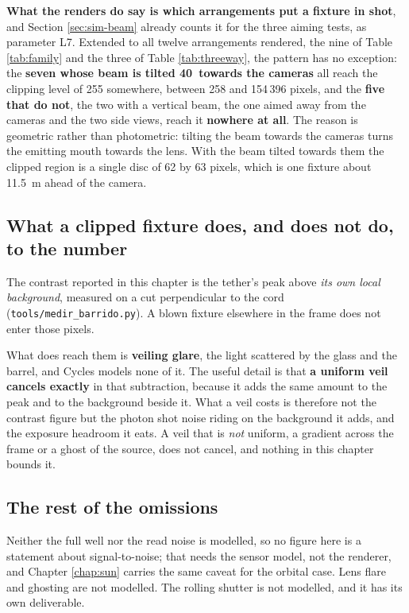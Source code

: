\textbf{What the renders do say is which arrangements put a fixture in
shot}, and Section \ref{sec:sim-beam} already counts it for the three aiming
tests, as parameter L7. Extended to all twelve arrangements rendered, the
nine of Table \ref{tab:family} and the three of Table \ref{tab:threeway}, the
pattern has no exception: the \textbf{seven whose beam is tilted
40\textdegree\ towards the cameras} all reach the clipping level of 255
somewhere, between 258 and 154\,396 pixels, and the \textbf{five that do
not}, the two with a vertical beam, the one aimed away from the cameras and
the two side views, reach it \textbf{nowhere at all}. The reason is geometric
rather than photometric: tilting the beam towards the cameras turns the
emitting mouth towards the lens. With the beam tilted towards them the
clipped region is a single disc of 62 by 63 pixels, which is one fixture
about 11.5~m ahead of the camera.

\subsection{What a clipped fixture does, and does not do, to the number}

The contrast reported in this chapter is the tether's peak above \emph{its
own local background}, measured on a cut perpendicular to the cord
(\texttt{tools/medir\_barrido.py}). A blown fixture elsewhere in the frame
does not enter those pixels.

What does reach them is \textbf{veiling glare}, the light scattered by the
glass and the barrel, and Cycles models none of it. The useful detail is that
\textbf{a uniform veil cancels exactly} in that subtraction, because it adds
the same amount to the peak and to the background beside it. What a veil
costs is therefore not the contrast figure but the photon shot noise riding
on the background it adds, and the exposure headroom it eats. A veil that is
\emph{not} uniform, a gradient across the frame or a ghost of the source,
does not cancel, and nothing in this chapter bounds it.

\subsection{The rest of the omissions}

Neither the full well nor the read noise is modelled, so no figure here is a
statement about signal-to-noise; that needs the sensor model, not the
renderer, and Chapter \ref{chap:sun} carries the same caveat for the orbital
case. Lens flare and ghosting are not modelled. The rolling shutter is not
modelled, and it has its own deliverable.

